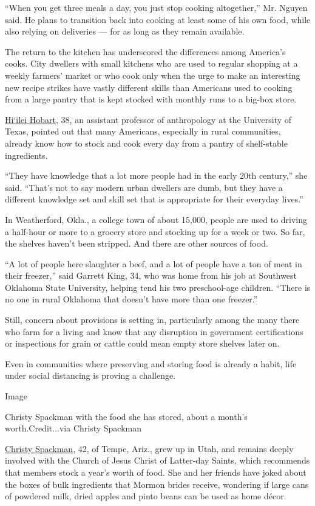``When you get three meals a day, you just stop cooking altogether,''
Mr. Nguyen said. He plans to transition back into cooking at least some
of his own food, while also relying on deliveries --- for as long as
they remain available.

The return to the kitchen has underscored the differences among
America's cooks. City dwellers with small kitchens who are used to
regular shopping at a weekly farmers' market or who cook only when the
urge to make an interesting new recipe strikes have vastly different
skills than Americans used to cooking from a large pantry that is kept
stocked with monthly runs to a big-box store.

\href{https://www.hiokinai.com/}{Hi`ilei Hobart}, 38, an assistant
professor of anthropology at the University of Texas, pointed out that
many Americans, especially in rural communities, already know how to
stock and cook every day from a pantry of shelf-stable ingredients.

``They have knowledge that a lot more people had in the early 20th
century,'' she said. ``That's not to say modern urban dwellers are dumb,
but they have a different knowledge set and skill set that is
appropriate for their everyday lives.''

In Weatherford, Okla., a college town of about 15,000, people are used
to driving a half-hour or more to a grocery store and stocking up for a
week or two. So far, the shelves haven't been stripped. And there are
other sources of food.

``A lot of people here slaughter a beef, and a lot of people have a ton
of meat in their freezer,'' said Garrett King, 34, who was home from his
job at Southwest Oklahoma State University, helping tend his two
preschool-age children. ``There is no one in rural Oklahoma that doesn't
have more than one freezer.''

Still, concern about provisions is setting in, particularly among the
many there who farm for a living and know that any disruption in
government certifications or inspections for grain or cattle could mean
empty store shelves later on.

Even in communities where preserving and storing food is already a
habit, life under social distancing is proving a challenge.

Image

Christy Spackman with the food she has stored, about a month's
worth.Credit...via Christy Spackman

\href{http://christyspackman.com/}{Christy Spackman}, 42, of Tempe,
Ariz., grew up in Utah, and remains deeply involved with the Church of
Jesus Christ of Latter-day Saints, which recommends that members stock a
year's worth of food. She and her friends have joked about the boxes of
bulk ingredients that Mormon brides receive, wondering if large cans of
powdered milk, dried apples and pinto beans can be used as home décor.

